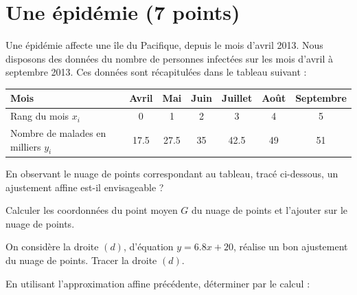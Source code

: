 \section{Une épidémie (7 points)}

Une épidémie affecte une île du Pacifique, depuis le mois d'avril 2013. Nous disposons des données du nombre de personnes infectées sur les mois d'avril à septembre 2013. Ces données sont récapitulées dans le tableau suivant :

\vspace*{0.5cm} 
\begin{center}
	\begin{tabular}{|@{\ }l@{\ }|@{\ }c@{\ }|@{\ }c@{\ }|@{\ }c@{\ }|@{\ }c@{\ }|@{\ }c@{\ }|@{\ }c@{\ }|}
		\hline
		Mois                                & Avril      & Mai        & Juin & Juillet    & Août & Septembre \\ \hline
		Rang du mois $x_i$                  & 0          & 1          & 2    & 3          & 4    & 5         \\ \hline
		Nombre de malades en milliers $y_i$ & \num{17.5} & \num{27.5} & 35   & \num{42.5} & 49   & 51        \\ \hline
	\end{tabular}
\end{center}

\begin{questions}
	\question[1] En observant le nuage de points correspondant au tableau, tracé ci-dessous, un ajustement affine est-il envisageable ?
	
	\question[1\half] Calculer les coordonnées du point moyen $G$ du nuage de points et l'ajouter sur le nuage de points.
	
	\question[2] On considère la droite $(d)$, d'équation $y = \num{6.8} x + 20$, réalise un bon ajustement du nuage de points. Tracer la droite $(d)$.
	
	\question En utilisant l'approximation affine précédente, déterminer par le calcul :
	
\end{questions}

